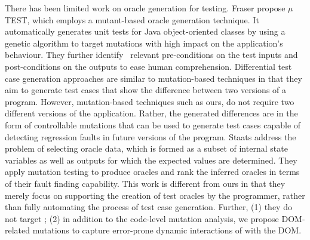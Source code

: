  \label{Sec:oracleGen}
There has been limited work on oracle generation for testing. 
Fraser \etal \cite{fraser:tse12} propose $\mu$TE\-ST, which employs a mutant-based oracle generation technique.  It automatically generates unit tests for Java object-oriented classes by using a genetic algorithm to target mutations with high impact on the application's behaviour. They further identify~\cite{fraser:issta11} relevant pre-conditions on the test inputs and post-conditions on the outputs to ease human comprehension.
Differential test case generation approaches \cite{taneja:ase08, elbaum:tse09} are similar to mutation-based techniques in that they aim to generate test cases that show the difference between two versions of a program. However, mutation-based techniques such as ours, do not require two different versions of the application.
Rather, the generated differences are in the form of controllable mutations that can be used to generate test cases capable of detecting
regression faults in future versions of the program.
Staats \etal \cite{staats:icse12} address the problem of selecting oracle data,  which is formed as a subset of internal state variables as well as outputs for which the expected values are determined.
They apply mutation testing to produce oracles and rank the inferred oracles in terms of their fault finding capability.
This work is different from ours in that they merely focus on supporting the creation of test oracles by the programmer, rather than fully automating the process of test case generation. Further, (1) they do not target \javascript; 
(2) in addition to the code-level mutation analysis, we propose DOM-related mutations to capture error-prone \cite{Ocariza:esem2013} dynamic interactions of \javascript with the DOM.  


